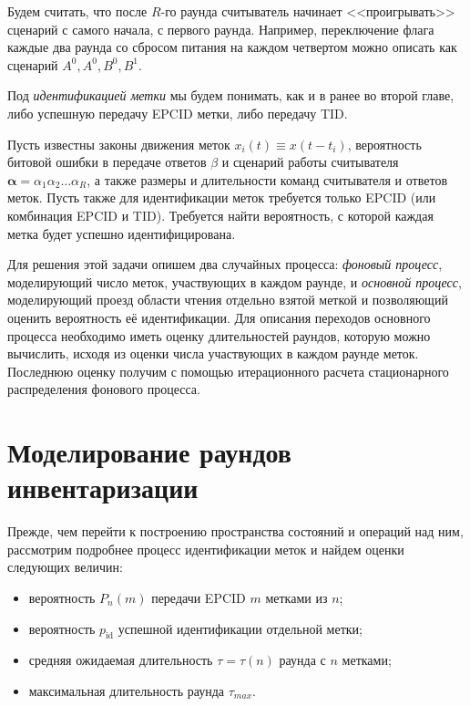 Будем считать, что после $R$-го раунда считыватель начинает <<проигрывать>> сценарий с самого начала, с первого раунда. Например, переключение флага каждые два раунда со сбросом питания на каждом четвертом можно описать как сценарий $A^0, A^0, B^0, B^1$.

Под \textit{идентификацией метки} мы будем понимать, как и в ранее во второй главе, либо успешную передачу EPCID метки, либо передачу TID.


\begin{probl}\label{problem:ch3_id_prob}
	Пусть известны законы движения меток $x_i(t) \equiv x(t - t_i)$, вероятность битовой ошибки в передаче ответов $\beta$ и сценарий работы считывателя $\bm{\alpha} = \alpha_1 \alpha_2 \dots \alpha_R$, а также размеры и длительности команд считывателя и ответов меток. Пусть также для идентификации меток требуется только EPCID (или комбинация EPCID и TID). Требуется найти вероятность, с которой каждая метка будет успешно идентифицирована.
\end{probl}

Для решения этой задачи опишем два случайных процесса: \textit{фоновый процесс}, моделирующий число меток, участвующих в каждом раунде, и \textit{основной процесс}, моделирующий проезд области чтения отдельно взятой меткой и позволяющий оценить вероятность её идентификации. Для описания переходов основного процесса необходимо иметь оценку длительностей раундов, которую можно вычислить, исходя из оценки числа участвующих в каждом раунде меток. Последнюю оценку получим с помощью итерационного расчета стационарного распределения фонового процесса.


\section{Моделирование раундов инвентаризации}\label{sec:ch3_inventory}
Прежде, чем перейти к построению пространства состояний и операций над ним, рассмотрим подробнее процесс идентификации меток и найдем оценки следующих величин:

\begin{itemize}
	\item вероятность $P_n(m)$ передачи EPCID $m$ метками из $n$;
	\item вероятность $p_\text{id}$ успешной идентификации отдельной метки;
	\item средняя ожидаемая длительность $\tau = \tau(n)$ раунда с $n$ метками;
	\item максимальная длительность раунда $\tau_{max}$.
\end{itemize}

